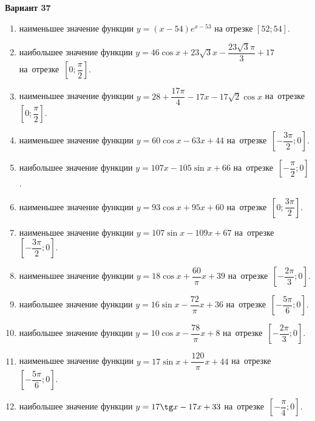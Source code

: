 \documentclass[a4paper,10pt]{article}
\begin{document}
\begin{center}\Large\textbf{Вариант 37}\end{center}

\begin{enumerate}
\item {} наименьшее значение функции $y = \left(x-54\right)e^{x-53}$ на отрезке $\left[52;54\right]$.

\item {} наибольшее значение функции $y = 46\cos x+23\sqrt{3}x-\dfrac{23\sqrt{3}\pi}{3} +17$ на~отрезке~$\left[0;\dfrac{\pi }{2}\right]$.

\item {} наименьшее значение функции $y = 28+\dfrac{17 \pi}{4}-17x-17\sqrt{2}\cos x$ на~отрезке~$\left[0;\dfrac{\pi }{2}\right]$.

\item {} наименьшее значение функции $y = 60\cos x-63x+44$ на~отрезке~$\left[-\dfrac{3\pi }{2};0\right]$.

\item {} наибольшее значение функции $y = 107x-105\sin x+66$ на~отрезке~$\left[-\dfrac{\pi }{2};0\right]$.

\item {} наименьшее значение функции $y = 93\cos x+95x+60$ на~отрезке~$\left[0;\dfrac{3\pi }{2}\right]$.

\item {} наименьшее значение функции $y = 107\sin x-109x+67$ на~отрезке~$\left[-\dfrac{3\pi }{2};0\right]$.

\item {} наименьшее значение функции $y = 18\cos x+\dfrac{60}{\pi }x +39$ на~отрезке~$\left[-\dfrac{2\pi }{3};0\right]$.

\item {} наибольшее значение функции $y = 16\sin x-\dfrac{72}{\pi }x+36$ на~отрезке~$\left[-\dfrac{5\pi }{6};0\right]$.

\item {} наибольшее значение функции $y = 10\cos x-\dfrac{78}{\pi }x+8$ на~отрезке~$\left[-\dfrac{2\pi }{3};0\right]$.

\item {} наименьшее значение функции $y = 17\sin x+\dfrac{120}{\pi }x+44$ на~отрезке~$\left[-\dfrac{5\pi }{6};0\right]$.

\item {} наибольшее значение функции $y = 17\tg x-17x+33$ на~отрезке~$\left[-\dfrac{\pi }{4};0\right]$.


\end{enumerate}
\end{document}
